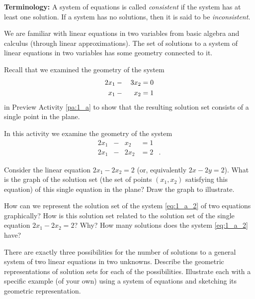 \noindent \textbf{Terminology:} A system of equations is called \emph{consistent} if the system has at least one solution. If a system has no solutions, then it is said to be \emph{inconsistent}.

\label{sec:geom_solu_sets}

We are familiar with linear equations in two variables from basic algebra and calculus (through linear approximations). The set of solutions to a system of linear equations in two variables has some geometry connected to it.


\begin{activity} \label{act:1_a_2} Recall that we examined the geometry of the system 
\begin{alignat}{4}
2x_1 	&{}-{}	&3x_2 	&= 0  \notag \\%
x_1 	&{}-{} 	&x_2		&= 1 \notag %
\end{alignat}
in Preview Activity \ref{pa:1_a} to show that the resulting solution set consists of a single point in the plane.

In this activity we examine the geometry of the system 
\begin{equation}\label{eq:1_a_2}
\begin{alignedat}{4}
{2}x_1 	&{}-{}	&{}x_2 	&= 1&{}  \\ %
{2}x_1 	&{}-{} 	&{2}x_2		&= 2&{.} %
\end{alignedat}
\end{equation}
\ba
\item Consider the linear equation $2x_1-2x_2=2$ (or, equivalently $2x-2y=2$). What is the graph of the solution set (the set of points $(x_1, x_2)$ satisfying this equation) of this single equation in the plane? Draw the graph to illustrate. 


\item How can we represent the solution set of the system \eqref{eq:1_a_2} of two equations graphically? How is this solution set related to the solution set of the single equation $2x_1-2x_2=2$? Why? How many solutions does the system \eqref{eq:1_a_2} have? 


\item There are exactly three possibilities for the number of solutions to a general system of two linear equations in two unknowns. Describe the geometric representations of solution sets for each of the possibilities. Illustrate each with a specific example (of your own) using a system of equations and sketching its geometric representation. 

\ea

\end{activity}


